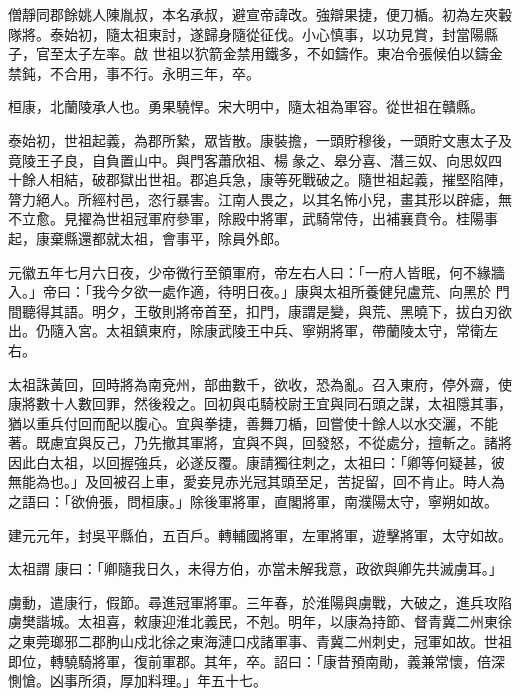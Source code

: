 \begin{pinyinscope}
 僧靜同郡餘姚人陳胤叔，本名承叔，避宣帝諱改。強辯果捷，便刀楯。初為左夾轂隊將。泰始初，隨太祖東討，遂歸身隨從征伐。小心慎事，以功見賞，封當陽縣子，官至太子左率。啟
 世祖以狖箭金禁用鐵多，不如鑄作。東冶令張候伯以鑄金禁鈍，不合用，事不行。永明三年，卒。



 桓康，北蘭陵承人也。勇果驍悍。宋大明中，隨太祖為軍容。從世祖在贛縣。



 泰始初，世祖起義，為郡所縶，眾皆散。康裝擔，一頭貯穆後，一頭貯文惠太子及竟陵王子良，自負置山中。與門客蕭欣祖、楊彖之、皋分喜、潛三奴、向思奴四十餘人相結，破郡獄出世祖。郡追兵急，康等死戰破之。隨世祖起義，摧堅陷陣，膂力絕人。所經村邑，恣行暴害。江南人畏之，以其名怖小兒，畫其形以辟瘧，無不立愈。見擢為世祖冠軍府參軍，除殿中將軍，武騎常侍，出補襄賁令。桂陽事起，康棄縣還都就太祖，會事平，除員外郎。



 元徽五年七月六日夜，少帝微行至領軍府，帝左右人曰：「一府人皆眠，何不緣牆入。」帝曰：「我今夕欲一處作適，待明日夜。」康與太祖所養健兒盧荒、向黑於
 門間聽得其語。明夕，王敬則將帝首至，扣門，康謂是變，與荒、黑曉下，拔白刃欲出。仍隨入宮。太祖鎮東府，除康武陵王中兵、寧朔將軍，帶蘭陵太守，常衛左右。



 太祖誅黃回，回時將為南兗州，部曲數千，欲收，恐為亂。召入東府，停外齋，使康將數十人數回罪，然後殺之。回初與屯騎校尉王宜與同石頭之謀，太祖隱其事，猶以重兵付回而配以腹心。宜與拳捷，善舞刀楯，回嘗使十餘人以水交灑，不能著。既慮宜與反己，乃先撤其軍將，宜與不與，回發怒，不從處分，擅斬之。諸將因此白太祖，以回握強兵，必遂反覆。康請獨往刺之，太祖曰：「卿等何疑甚，彼無能為也。」及回被召上車，愛妾見赤光冠其頭至足，苦捉留，回不肯止。時人為之語曰：「欲侜張，問桓康。」除後軍將軍，直閣將軍，南濮陽太守，寧朔如故。



 建元元年，封吳平縣伯，五百戶。轉輔國將軍，左軍將軍，遊擊將軍，太守如故。



 太祖謂
 康曰：「卿隨我日久，未得方伯，亦當未解我意，政欲與卿先共滅虜耳。」



 虜動，遣康行，假節。尋進冠軍將軍。三年春，於淮陽與虜戰，大破之，進兵攻陷虜樊諧城。太祖喜，敕康迎淮北義民，不剋。明年，以康為持節、督青冀二州東徐之東莞瑯邪二郡朐山戍北徐之東海漣口戍諸軍事、青冀二州刺史，冠軍如故。世祖即位，轉驍騎將軍，復前軍郡。其年，卒。詔曰：「康昔預南勛，義兼常懷，倍深惻愴。凶事所須，厚加料理。」年五十七。




\end{pinyinscope}

